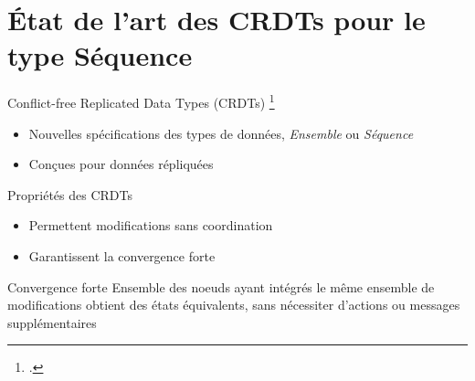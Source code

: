 \section{État de l'art des CRDTs pour le type Séquence}

\begin{frame}{Conflict-free Replicated Data Types (CRDTs) \footcite{shapiro_2011_crdt}}
    \begin{itemize}
        \item Nouvelles spécifications des types de données, \eg \emph{Ensemble} ou \emph{Séquence}
        \item Conçues pour données répliquées
    \end{itemize}
    \pause
    \begin{block}{Propriétés des CRDTs}
        \begin{itemize}
            \item Permettent modifications \alert{sans coordination}
            \item Garantissent la \alert{convergence forte}
        \end{itemize}
    \end{block}
    \pause
    \begin{block}{Convergence forte}
        Ensemble des noeuds ayant intégrés le même ensemble de modifications obtient des états équivalents, sans nécessiter d'actions ou messages supplémentaires
    \end{block}
\end{frame}



